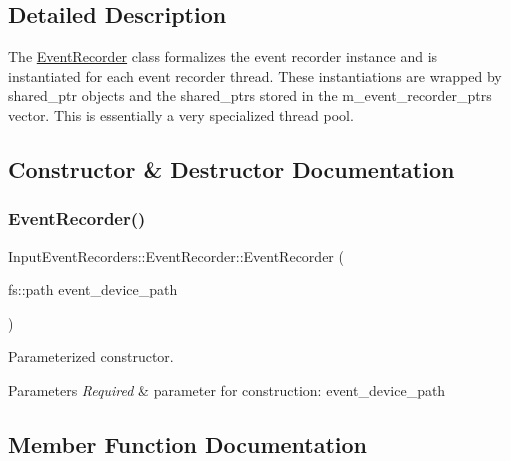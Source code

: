 \subsection{Detailed Description}
The \mbox{\hyperlink{classEventDetect_1_1InputEventRecorders_1_1EventRecorder}{Event\+Recorder}} class formalizes the event recorder instance and is instantiated for each event recorder thread. These instantiations are wrapped by shared\+\_\+ptr objects and the shared\+\_\+ptrs stored in the m\+\_\+event\+\_\+recorder\+\_\+ptrs vector. This is essentially a very specialized thread pool. 

\subsection{Constructor \& Destructor Documentation}
\mbox{\label{classEventDetect_1_1InputEventRecorders_1_1EventRecorder_af865f9dcce55575066f874f93701e03d}} 
\subsubsection{\texorpdfstring{Event\+Recorder()}{EventRecorder()}}
{\footnotesize\ttfamily Input\+Event\+Recorders\+::\+Event\+Recorder\+::\+Event\+Recorder (\begin{DoxyParamCaption}\item[{fs\+::path}]{event\+\_\+device\+\_\+path }\end{DoxyParamCaption})\hspace{0.3cm}{\ttfamily [explicit]}}



Parameterized constructor. 


\begin{DoxyParams}{Parameters}
{\em Required} & parameter for construction\+: event\+\_\+device\+\_\+path \\
\hline
\end{DoxyParams}


\subsection{Member Function Documentation}
\mbox{\label{classEventDetect_1_1InputEventRecorders_1_1EventRecorder_a33725666187f177b9961bbd65d8fd944}} 
